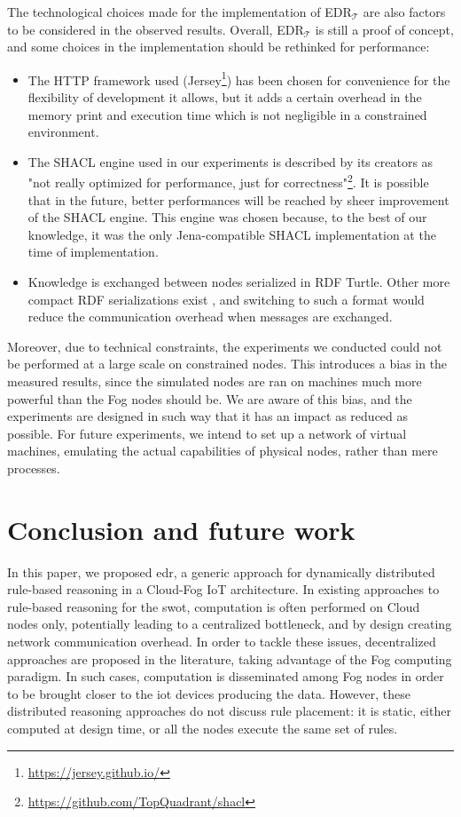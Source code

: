 \documentclass{iosart2c}
\newcommand{\edrt}{EDR$_{\mathcal{T}}$\xspace}
\begin{document}
The technological choices made for the implementation of \edrt are also factors to be considered in the observed results. 
Overall, \edrt is still a proof of concept, and some choices in the implementation should be rethinked for performance: 
\begin{itemize}
	\item The HTTP framework used (Jersey\footnote{\url{https://jersey.github.io/}}) has been chosen for convenience for the flexibility of development it allows, but it adds a certain overhead in the memory print and execution time which is not negligible in a constrained environment.
	\item The SHACL engine used in our experiments is described by its creators as "not really optimized for performance, just for correctness"\footnote{\url{https://github.com/TopQuadrant/shacl}}.
	It is possible that in the future, better performances will be reached by sheer improvement of the SHACL engine.
	This engine was chosen because, to the best of our knowledge, it was the only Jena-compatible SHACL implementation at the time of implementation.
	\item Knowledge is exchanged between nodes serialized in RDF Turtle. 
	Other more compact RDF serializations exist \cite{Su2015}, and switching to such a format would reduce the communication overhead when messages are exchanged.
\end{itemize}

Moreover, due to technical constraints, the experiments we conducted could not be performed at a large scale on constrained nodes.
This introduces a bias in the measured results, since the simulated nodes are ran on machines much more powerful than the Fog nodes should be. 
We are aware of this bias, and the experiments are designed in such way that it has an impact as reduced as possible.
For future experiments, we intend to set up a network of virtual machines, emulating the actual capabilities of physical nodes, rather than mere processes.

\section{Conclusion and future work}
\label{sec:conclusion}

In this paper, we proposed \gls{edr}, a generic approach for dynamically distributed rule-based reasoning in a Cloud-Fog IoT architecture.
In existing approaches to rule-based reasoning for the \gls{swot}, computation is often performed on Cloud nodes only, potentially leading to a centralized bottleneck, and by design creating network communication overhead.
In order to tackle these issues, decentralized approaches are proposed in the literature, taking advantage of the Fog computing paradigm. 
In such cases, computation is disseminated among Fog nodes in order to be brought closer to the \gls{iot} devices producing the data.
However, these distributed reasoning approaches do not discuss rule placement: it is static, either computed at design time, or all the nodes execute the same set of rules.
\end{document}
